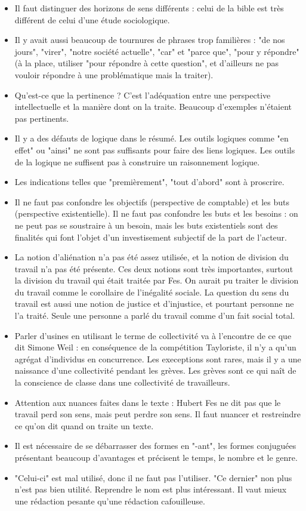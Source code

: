 \documentclass[a4paper,12pt]{book}
\begin{document}
\begin{itemize}
\item Il faut distinguer des horizons de sens différents : celui de la bible est très différent de celui d'une étude sociologique.
\item Il y avait aussi beaucoup de tournures de phrases trop familières : "de nos jours", "virer", "notre société actuelle", "car" et "parce que", "pour y répondre" (à la place, utiliser "pour répondre à cette question", et d'ailleurs ne pas vouloir répondre à une problématique mais la traiter).
\item Qu'est-ce que la pertinence ? C'est l'adéquation entre une perspective intellectuelle et la manière dont on la traite. Beaucoup d'exemples n'étaient pas pertinents.
\item Il y a des défauts de logique dans le résumé. Les outils logiques comme "en effet" ou "ainsi" ne sont pas suffisants pour faire des liens logiques. Les outils de la logique ne suffisent pas à construire un raisonnement logique.
\item Les indications telles que "premièrement", "tout d'abord" sont à proscrire.
\item Il ne faut pas confondre les objectifs (perspective de comptable) et les buts (perspective existentielle). Il ne faut pas confondre les buts et les besoins : on ne peut pas se soustraire à un besoin, mais les buts existentiels sont des finalités qui font l'objet d'un investisement subjectif de la part de l'acteur.
\item La notion d'aliénation n'a pas été assez utilisée, et la notion de division du travail n'a pas été présente. Ces deux notions sont très importantes, surtout la division du travail qui était traitée par Fes. On aurait pu traiter le division du travail comme le corollaire de l'inégalité sociale. La question du sens du travail est aussi une notion de justice et d'injustice, et pourtant personne ne l'a traité. Seule une personne a parlé du travail comme d'un fait social total.
\item Parler d'usines en utilisant le terme de collectivité va à l'encontre de ce que dit Simone Weil : en conséquence de la compétition Tayloriste, il n'y a qu'un agrégat d'individus en concurrence. Les execeptions sont rares, mais il y a une naissance d'une collectivité pendant les grèves. Les grèves sont ce qui naît de la conscience de classe dans une collectivité de travailleurs.
\item Attention aux nuances faites dans le texte : Hubert Fes ne dit pas que le travail perd son sens, mais peut perdre son sens. Il faut nuancer et restreindre ce qu'on dit quand on traite un texte.
\item Il est nécessaire de se débarrasser des formes en "-ant", les formes conjuguées présentant beaucoup d'avantages et précisent le temps, le nombre et le genre. 
\item "Celui-ci" est mal utilisé, donc il ne faut pas l'utiliser. "Ce dernier" non plus n'est pas bien utilité. Reprendre le nom est plus intéressant. Il vaut mieux une rédaction pesante qu'une rédaction cafouilleuse.
\end{itemize}
\end{document}
